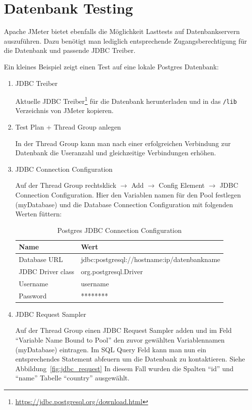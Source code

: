 \documentclass[a4paper,12pt]{article}
\newcommand{\codeInLine}[1]{%
\colorbox{graybackgroundColor}{\lstinline{#1}} %
}
\begin{document}
\section{Datenbank Testing}
Apache JMeter bietet ebenfalls die Möglichkeit Lasttests auf Datenbankservern auszuführen. Dazu benötigt man lediglich entsprechende Zugangsberechtigung für die Datenbank und passende JDBC Treiber. 

Ein kleines Beispiel zeigt einen Test auf eine lokale Postgres Datenbank:

\begin{enumerate}
	\item JDBC Treiber
		
	Aktuelle JDBC Treiber\footnote{\url{https://jdbc.postgresql.org/download.html}} für die Datenbank herunterladen und in das \codeInLine{/lib} Verzeichnis von JMeter kopieren. 
	
	\item Test Plan + Thread Group anlegen
	
	In der Thread Group kann man nach einer erfolgreichen Verbindung zur Datenbank die Useranzahl und gleichzeitige Verbindungen erhöhen.
	
	\item JDBC Connection Configuration
	
	Auf der Thread Group rechtsklick $\rightarrow$ Add $\rightarrow$ Config Element $\rightarrow$ JDBC Connection Configuration. Hier den Variablen namen für den Pool festlegen (myDatabase) und die Database Connection Configuration mit folgenden Werten füttern:
	
	\begin{table}[H]
	\centering
	\begin{tabular}{|l|l|}
		\hline
		\textbf{Name} & \textbf{Wert} \\
		\hline
		Database URL & jdbc:postgresql://hostname:ip/datenbankname \\
		JDBC Driver class & org.postgresql.Driver \\
		Username & username \\
		Password & ******** \\
		\hline
	\end{tabular}
	\caption[tab_jdbc_values]{Postgres JDBC Connection Configuration}
	\label{tab_jdbc_values}
\end{table}
	
	\item JDBC Request Sampler
	
	Auf der Thread Group einen JDBC Request Sampler adden und im Feld "`Variable Name Bound to Pool"' den zuvor gewählten Variablennamen (myDatabase) eintragen.  
	Im SQL Query Feld kann man nun ein entsprechendes Statement abfeuern um die Datenbank zu kontaktieren. Siehe Abbildung~\ref{fig:jdbc_request} In diesem Fall wurden die Spalten "`id"' und "`name"' Tabelle "`country"' ausgewählt.
	

\end{enumerate}
\end{document}
